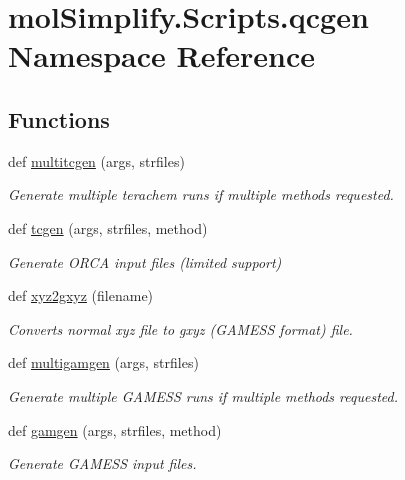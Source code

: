 \hypertarget{namespacemolSimplify_1_1Scripts_1_1qcgen}{}\section{mol\+Simplify.\+Scripts.\+qcgen Namespace Reference}
\label{namespacemolSimplify_1_1Scripts_1_1qcgen}
\subsection*{Functions}
\begin{DoxyCompactItemize}
\item 
def \hyperlink{namespacemolSimplify_1_1Scripts_1_1qcgen_a94d2464e1bb9c7d8af5d714a947d6994}{multitcgen} (args, strfiles)
\begin{DoxyCompactList}\small\item\em Generate multiple terachem runs if multiple methods requested. \end{DoxyCompactList}\item 
def \hyperlink{namespacemolSimplify_1_1Scripts_1_1qcgen_aa7bd72c4230e61a3db1f2162a04c3e77}{tcgen} (args, strfiles, method)
\begin{DoxyCompactList}\small\item\em Generate O\+R\+CA input files (limited support) \end{DoxyCompactList}\item 
def \hyperlink{namespacemolSimplify_1_1Scripts_1_1qcgen_a67aee71c611a98c744c92e8670b6ebeb}{xyz2gxyz} (filename)
\begin{DoxyCompactList}\small\item\em Converts normal xyz file to gxyz (G\+A\+M\+E\+SS format) file. \end{DoxyCompactList}\item 
def \hyperlink{namespacemolSimplify_1_1Scripts_1_1qcgen_ac9ba55dfec85cff6e4ecabe2a4733e4d}{multigamgen} (args, strfiles)
\begin{DoxyCompactList}\small\item\em Generate multiple G\+A\+M\+E\+SS runs if multiple methods requested. \end{DoxyCompactList}\item 
def \hyperlink{namespacemolSimplify_1_1Scripts_1_1qcgen_a9669d94c4c797a40526361b957e663ff}{gamgen} (args, strfiles, method)
\begin{DoxyCompactList}\small\item\em Generate G\+A\+M\+E\+SS input files. \end{DoxyCompactList}\item 

\end{DoxyCompactItemize}
